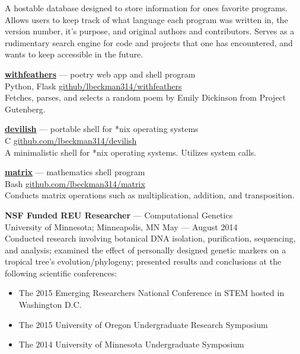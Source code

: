 \documentclass[a4paper]{article}
\begin{document}
A hostable database designed to store information for ones favorite programs. Allows users to keep track of what language each program was written in, the version number, it’s purpose, and original authors and contributors. Serves as a rudimentary search engine for code and projects that one has encountered, and wants to keep accessible in the future.

\textcolor{my-grey}{\dotfill}
\medbreak

\textcolor{my-blue}{\textbf{\href{https://withfeathers.liambeckman.com}{withfeathers}}} --- poetry web app and shell program\\
\textcolor{my-grey}{Python, Flask \hfill \href{https://github.com/lbeckman314/withfeathers}{github/lbeckman314/withfeathers}}\\

Fetches, parses, and selects a random poem by Emily Dickinson from Project Gutenberg.

\textcolor{my-grey}{\dotfill}
\medbreak

\textcolor{my-blue}{\textbf{\href{https://liambeckman.com/code/devilish}{devilish}}} --- portable shell for *nix operating systems\\
\textcolor{my-grey}{C \hfill \href{https://github.com/lbeckman314/devilsh}{github.com/lbeckman314/devilish}}\\

A minimalistic shell for *nix operating systems. Utilizes system calls.

\textcolor{my-grey}{\dotfill}
\medbreak

\textcolor{my-blue}{\textbf{\href{https://liambeckman.com/code/matrix}{matrix}}} --- mathematics shell program\\
\textcolor{my-grey}{Bash \hfill \href{https://github.com/lbeckman314/matrix}{github.com/lbeckman314/matrix}}\\

Conducts matrix operations such as multiplication, addition, and transposition.

\textcolor{my-grey}{\dotfill}
\medbreak

\textbf{NSF Funded REU Researcher} --- Computational Genetics\\
\textcolor{my-grey}{University of Minnesota; Minneapolis, MN \hfill  May — August 2014}\\

Conducted research involving botanical DNA isolation, purification, sequencing, and analysis; examined the effect of personally designed genetic markers on a tropical tree's evolution/phylogeny; presented results and conclusions at the following scientific conferences:\\
\begin{itemize}
\item The 2015 Emerging Researchers National Conference in STEM hosted in Washington D.C.
\item The 2015 University of Oregon Undergraduate Research Symposium
\item The 2014 University of Minnesota Undergraduate Symposium
\end{itemize}
\end{document}

